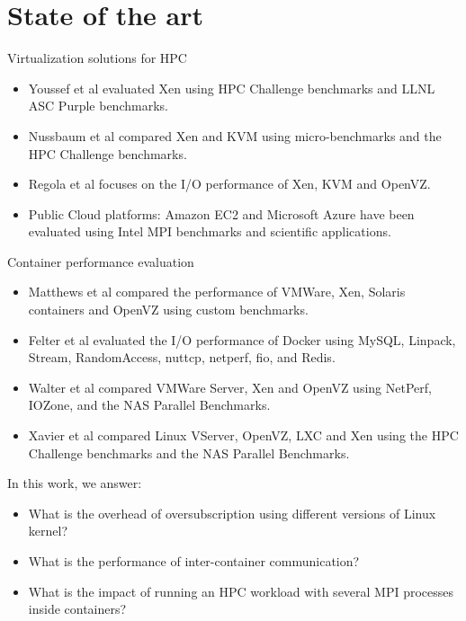\documentclass[presentation]{beamer}
\begin{document}
\section{State of the art}
\label{sec-2}
\begin{frame}[label=sec-2-1]{Virtualization solutions for HPC}
\begin{itemize}
\item Youssef et al\cite{Youseff:2006:EPI:1308175.1308346} evaluated Xen using HPC
Challenge benchmarks and LLNL ASC Purple benchmarks.

\item Nussbaum et al\cite{nussbaum2009linux} compared Xen and KVM using
micro-benchmarks and the HPC Challenge benchmarks.

\item Regola et al\cite{regola2010recommendations} focuses on the I/O
performance of Xen, KVM and OpenVZ.

\item Public Cloud platforms: Amazon EC2 \cite{5353067} and Microsoft Azure\cite{Tudoran:2012:PEA:2168697.2168701}
  have been evaluated using Intel MPI benchmarks and scientific applications.
\end{itemize}
\end{frame}

\begin{frame}[label=sec-2-2]{Container performance evaluation}
\begin{itemize}
\item Matthews et al\cite{matthews2007quantifying} compared the performance of VMWare,
Xen, Solaris containers and OpenVZ using custom benchmarks.
\item Felter et al\cite{ibmtrdocker} evaluated the I/O performance of Docker using MySQL,
Linpack, Stream, RandomAccess, nuttcp, netperf, fio, and Redis.
\item Walter et al\cite{4482796} compared VMWare Server, Xen and OpenVZ using NetPerf, IOZone, and the NAS Parallel Benchmarks.

\item Xavier et al\cite{6498558} compared Linux VServer, OpenVZ,
LXC and Xen using the HPC Challenge benchmarks and the NAS
Parallel Benchmarks.
\end{itemize}
\end{frame}

{
\begin{frame}[label=sec-2-3]{In this work, we answer:}



\begin{itemize}
\item What is the overhead of oversubscription using different versions of Linux kernel?
\item What is the performance of inter-container communication?
\item What is the impact of running an HPC workload with several MPI processes inside containers?
\end{itemize}
\end{frame}
}
\end{document}
